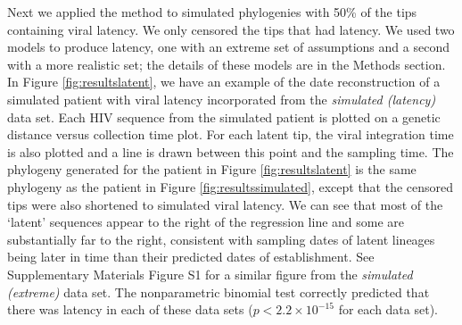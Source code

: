 \documentclass{bmcart}
\begin{document}





Next we applied the method to simulated phylogenies with 50\% of the tips containing viral latency.
We only censored the tips that had latency.
We used two models to produce latency, one with an extreme set of assumptions and a second with a more realistic set; the details of these models are in the Methods section.
In Figure \ref{fig:resultslatent}, we have an example of the date reconstruction of a simulated patient with viral latency incorporated from the \emph{simulated (latency)} data set.
Each HIV sequence from the simulated patient is plotted on a genetic distance versus collection time plot.
For each latent tip, the viral integration time is also plotted and a line is drawn between this point and the sampling time.
The phylogeny generated for the patient in Figure \ref{fig:resultslatent} is the same phylogeny as the patient in Figure \ref{fig:resultssimulated}, except that the censored tips were also shortened to simulated viral latency.
We can see that most of the `latent' sequences appear to the right of the regression line and some are substantially far to the right, consistent with sampling dates of latent lineages being later in time than their predicted dates of establishment.
See Supplementary Materials Figure S1 for a similar figure from the \emph{simulated (extreme)} data set.
The nonparametric binomial test correctly predicted that there was latency in each of these data sets ($p < 2.2 \times 10^{-15}$ for each data set).
\end{document}

